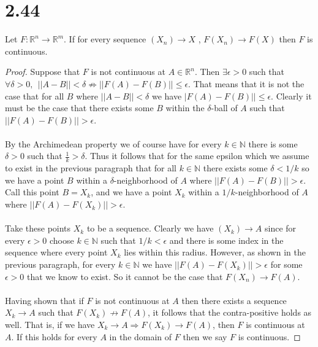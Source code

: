 \documentclass{article}
\theoremstyle{definition}
\begin{document}
\section*{2.44}
\begin{mdframed}
    Let $F:\mathbb{R}^n \rightarrow \mathbb{R}^m$. If for every sequence $(X_n)\rightarrow X$
    , $F(X_n) \rightarrow F(X)$ then $F$ is continuous.
\end{mdframed}
\begin{proof}
    Suppose that $F$ is not continuous at $A \in \mathbb{R}^n$. Then $\exists \epsilon > 0$
    such that $\forall \delta > 0, \ \ ||A - B||< \delta \not \Rightarrow ||F(A)-F(B)||\leqslant \epsilon$.
    That means that it is not the case that for all $B$ where $||A-B||< \delta$ we have $|F(A)-F(B)||\leqslant \epsilon$.
    Clearly it must be the case that there exists some $B$ within the $\delta$-ball of $A$ such that $||F(A) - F(B)||>\epsilon$.\\\\
    By the Archimedean property we of course have for every $k \in \mathbb{N}$ there is some $\delta > 0$ such that $\frac{1}{k} > \delta$.
    Thus it follows that for the same epsilon which we assume to exist in the previous paragraph that for all $k \in \mathbb{N}$ there exists
    some $\delta < 1 / k$ so we have a point $B$ within a $\delta$-neighborhood of $A$ where $||F(A)-F(B)||>\epsilon$.
    Call this point $B = X_k$, and we have a point $X_k$ within a $1 / k$-neighborhood of $A$ where $||F(A) - F(X_k)|| > \epsilon$. \\\\
    Take these points $X_k$ to be a sequence. Clearly we have $(X_k) \rightarrow A$ since for every $\epsilon > 0$ choose $k \in \mathbb{N}$
    such that $1 / k < \epsilon$ and there is some index in the sequence where every point $X_k$ lies within this radius.
    However, as shown in the previous paragraph, for every $k \in \mathbb{N}$ we have $||F(A) - F(X_k)|| > \epsilon$ for some $\epsilon > 0$ that we know 
    to exist. So it cannot be the case that $F(X_n) \rightarrow F(A)$.\\\\
    Having shown that if $F$ is not continuous at $A$ then there exists a sequence $X_k \rightarrow A$
    such that $F(X_k) \not\rightarrow F(A)$, it follows that the contra-positive holds as well.
    That is, if we have $X_k \rightarrow A \Rightarrow F(X_k) \rightarrow F(A)$, then $F$ is continuous at $A$.
    If this holds for every $A$ in the domain of $F$ then we say $F$ is continuous.
\end{proof}
\end{document}
